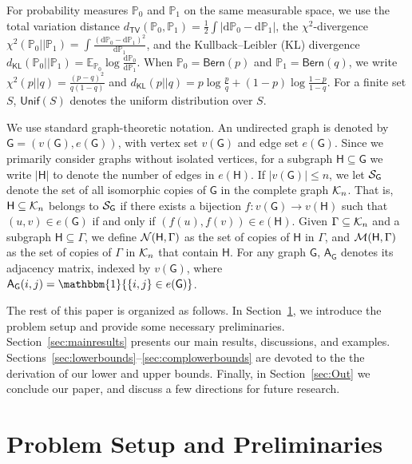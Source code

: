 \documentclass[12pt]{article}
\newcommand{\bE}{\mathbb{E}}
\newcommand{\Ind}{\mathbbm{1}}
\def\P{{\mathbb P}}
\newcommand{\calK}{{\cal K}}
\newcommand{\calM}{{\cal M}}
\newcommand{\calN}{{\cal N}}
\newcommand{\calS}{{\cal S}}
\newcommand{\s}[1]{\mathsf{#1}}
\begin{document}
For probability measures $\P_0$ and $\P_1$ on the same measurable space, we use the total variation distance
$d_{\s{TV}}(\P_0,\P_1)=\frac{1}{2}\int|\mathrm{d}\P_0-\mathrm{d}\P_1|$, the $\chi^2$-divergence $\chi^2(\P_0||\P_1)=\int \frac{(\mathrm{d}\P_0-\mathrm{d}\P_1)^2}{\mathrm{d}\P_1}$, and the Kullback--Leibler (KL) divergence $d_{\s{KL}}(\P_0||\P_1)=\bE_{\P_0}\log\frac{\mathrm{d}\P_0}{\mathrm{d}\P_1}$. 
When $\P_0=\s{Bern}(p)$ and $\P_1=\s{Bern}(q)$, we write $\chi^2(p||q)=\frac{(p-q)^2}{q(1-q)}$ and $d_{\s{KL}}(p||q)=p\log\frac{p}{q}+(1-p)\log\frac{1-p}{1-q}$. For a finite set $S$, $\s{Unif}(S)$ denotes the uniform distribution over $S$.

We use standard graph-theoretic notation. An undirected graph is denoted by $\s{G}=(v(\s{G}),e(\s{G}))$, with vertex set $v(\s{G})$ and edge set $e(\s{G})$. Since we primarily consider graphs without isolated vertices, for a subgraph $\s{H}\subseteq\s{G}$ we write $|\s{H}|$ to denote the number of edges in $e(\s{H})$. If $|v(\s{G})|\le n$, we let $\calS_{\s{G}}$ denote the set of all isomorphic copies of $\s{G}$ in the complete graph $\calK_n$. That is, $\s{H}\subseteq\calK_n$ belongs to $\calS_{\s{G}}$ if there exists a bijection $f:v(\s{G})\to v(\s{H})$ such that $(u,v)\in e(\s{G})$ if and only if $(f(u),f(v))\in e(\s{H})$. Given $\Gamma\subseteq\calK_n$ and a subgraph $\s{H}\subseteq\Gamma$, we define $\calN(\s{H},\Gamma)$ as the set of copies of $\s{H}$ in $\Gamma$, and $\calM(\s{H},\Gamma)$ as the set of copies of $\Gamma$ in $\calK_n$ that contain $\s{H}$. For any graph $\s{G}$, $\s{A}_{\s{G}}$ denotes its adjacency matrix, indexed by $v(\s{G})$, where $\s{A}_{\s{G}}(i,j)=\Ind\{\{i,j\}\in e(\s{G})\}$.

The rest of this paper is organized as follows. In Section~\ref{sec:problem}, we introduce the problem setup and provide some necessary preliminaries. Section~\ref{sec:mainresults} presents our main results, discussions, and examples. Sections~\ref{sec:lowerbounds}--\ref{sec:complowerbounds} are devoted to the the derivation of our lower and upper bounds. Finally, in Section~\ref{sec:Out} we conclude our paper, and discuss a few directions for future research.

\section{Problem Setup and Preliminaries}\label{sec:problem}
\end{document}
